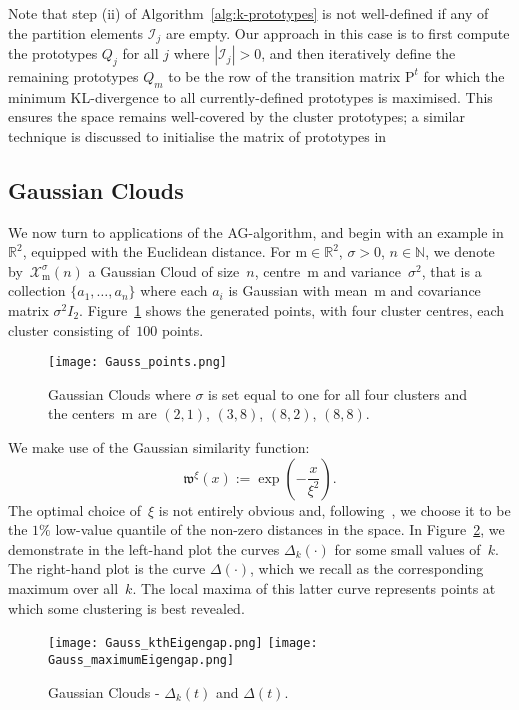 \documentclass{amsart}[11pt]
\numberwithin{equation}{section}
\theoremstyle{definition}
\newcommand{\Xx}{\mathcal{X}}
\newcommand{\mm}{\mathrm{m}}
\newcommand{\NN}{\mathbb{N}}
\newcommand{\RR}{\mathbb{R}}
\newcommand{\wf}{\mathfrak{w}}
\newcommand{\Pf}{\mathrm{P}}
\begin{document}
Note that step (ii) of Algorithm~\ref{alg:k-prototypes} is not well-defined if any of the partition elements $\mathcal{I}_j$ are empty. Our approach in this case is to first compute the prototypes $Q_j$ for all $j$ where $| \mathcal{I}_j | > 0$, and then iteratively define the remaining prototypes $Q_m$ to be the row of the transition matrix $\Pf^t$ for which the minimum KL-divergence to all currently-defined prototypes is maximised. This ensures the space remains well-covered by the cluster prototypes; a similar technique is discussed to initialise the matrix of prototypes in~\cite[Section 4.2]{Azran06}


\subsection{Gaussian Clouds}

We now turn to applications of the AG-algorithm,
and begin with an example in~$\RR^2$, equipped with the Euclidean distance.
For $\mm\in \RR^2$, $\sigma>0$, $n \in \NN$, we denote by~$\Xx_{\mm}^{\sigma}(n)$ a Gaussian Cloud of size~$n$,  centre~$\mm$ and variance~$\sigma^2$, 
that is a collection $\{a_1, \ldots, a_n\}$ where each $a_i$ is Gaussian with mean~$\mm$ and covariance matrix $\sigma^2 I_2$.
Figure~\ref{fig:gaussian-clouds-points} shows the generated points, with four cluster centres, 
each cluster consisting of~$100$ points.

\begin{figure}[ht]
    \centering
        \texttt{[image: Gauss\_points.png]}
    \caption{Gaussian Clouds where $\sigma$ is set equal to one for all four clusters and the centers~$\mm$ are 
$(2, 1)$, $(3, 8)$, $(8, 2)$, $(8, 8)$.}
    \label{fig:gaussian-clouds-points}
\end{figure}

We make use of the Gaussian similarity function:
\begin{equation}\label{eq:gaussian-similarity}
\wf^\xi(x) := \exp \left( - \frac{x}{\xi^2} \right).
\end{equation}
The optimal choice of~$\xi$ is not entirely obvious and, following~\cite{Azran06}, we choose it to be the $1\%$ low-value quantile of the non-zero distances in the space.
In Figure~\ref{fig:gaussian-clouds-eigengap-separations}, we demonstrate in the left-hand plot the curves $\Delta_k(\cdot)$ for some small values of~$k$. The right-hand plot is the curve $\Delta(\cdot)$, which we recall as the corresponding maximum over all~$k$. 
The local maxima of this latter curve represents points at which some clustering is best revealed. 
\begin{figure}[hb!]
    \centering
        \texttt{[image: Gauss\_kthEigengap.png]}
        \texttt{[image: Gauss\_maximumEigengap.png]}
        \caption{Gaussian Clouds - $\Delta_k(t)$ and $\Delta(t)$.}
        \label{fig:gaussian-clouds-eigengap-separations}
\end{figure}
\end{document}
